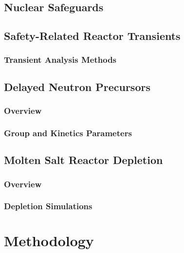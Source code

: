 \documentclass[edeposit,fullpage,hidelinks]{uiucthesis2018}
\begin{document}
\section{Nuclear Safeguards}


\section{Safety-Related Reactor Transients}


\subsection{Transient Analysis Methods}
\label{sec:bg-trans-analysis-methods}


\section{Delayed Neutron Precursors}

\subsection{Overview}


\subsection{Group and Kinetics Parameters}
\label{sec:gandkparams}




\section{Molten Salt Reactor Depletion}
\subsection{Overview}


\subsection{Depletion Simulations}







\chapter{Methodology}
\end{document}
